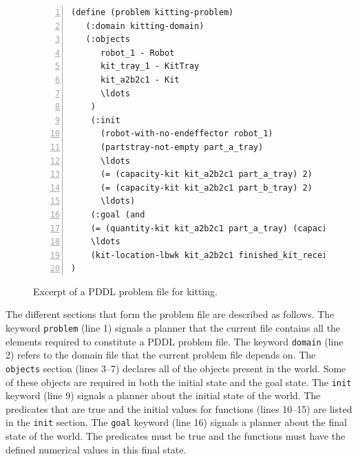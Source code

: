 \begin{figure}[t!h!]
\begin{minipage}{.7\paperwidth}
\begin{list}{}{\setlength{\leftmargin}{1em}}\item\small
\begin{Verbatim}[commandchars=\\\{\},fontsize=\scriptsize, numbers=left, numbersep=2pt]
(define (problem kitting-problem)
   (:domain kitting-domain)
   (:objects
      robot_1 - Robot
      kit_tray_1 - KitTray
      kit_a2b2c1 - Kit
      \ldots
	)
    (:init
      (robot-with-no-endeffector robot_1)
      (partstray-not-empty part_a_tray)
      \ldots
      (= (capacity-kit kit_a2b2c1 part_a_tray) 2)
      (= (capacity-kit kit_a2b2c1 part_b_tray) 2)
      \ldots)
    (:goal (and
    (= (quantity-kit kit_a2b2c1 part_a_tray) (capacity-kit kit_a2b2c1 part_a_tray))
    \ldots
    (kit-location-lbwk kit_a2b2c1 finished_kit_receiver))
)
\end{Verbatim}
\end{list}
\end{minipage}
\caption{Excerpt of a PDDL problem file for kitting.}
\label{fig:problem}
\end{figure}

The different sections that form the problem file are described as follows. The keyword 
\texttt{problem} (line 1) signals a planner that the current file contains all the elements 
required to constitute a PDDL problem file. The keyword \texttt{domain} (line 2) refers to 
the domain file that the current problem file depends on. The \texttt{objects} section (lines 3--7) 
declares all of the objects present in the world. Some of these objects are required in both the 
initial state and the goal state. The \texttt{init} keyword (line 9) signals a planner about 
the initial state of the world. The predicates that are true and the initial values for 
functions (lines 10--15) are listed in the \texttt{init} section. The \texttt{goal} keyword 
(line 16) signals a planner about the final state of the world. The predicates must be true 
and the functions must have the defined numerical values in this final state.


